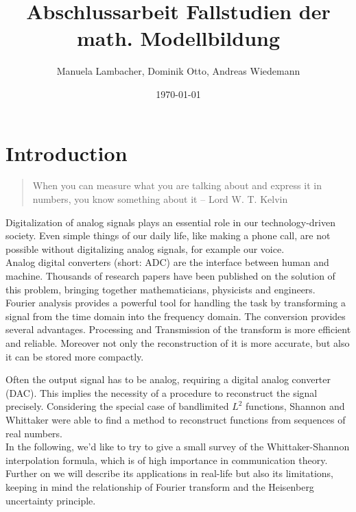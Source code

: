 \documentclass[a4paper, 11pt]{scrreprt}
\title{Abschlussarbeit Fallstudien der math. Modellbildung}
\author{Manuela Lambacher, Dominik Otto, Andreas Wiedemann}
\date{\today}
\newcommand{\student}[1]{\marginnote{{\normalfont\bf #1}}}
\begin{document}
\parindent 0pt
\maketitle
\tableofcontents

\chapter*{Introduction}

\begin{quotation}
When you can measure what you are talking about and express it in numbers, you know something about it – Lord W. T. Kelvin
\end{quotation}
\student{together}
Digitalization of analog signals plays an essential role in our technology-driven society. Even simple things of our daily life, like making a phone call, are not possible without digitalizing analog signals, for example our voice. \\
\newline
Analog digital converters (short: ADC) are the interface between human and machine. Thousands of research papers have been published on the solution of this problem, bringing together mathematicians, physicists and engineers. \\
Fourier analysis provides a powerful tool for handling the task by transforming a signal from the time domain into the frequency domain. The conversion provides several advantages. Processing and Transmission of the transform is more efficient and reliable. Moreover not only the reconstruction of it is more accurate, but also it can be stored more compactly.

Often the output signal has to be analog, requiring a digital analog converter (DAC). This implies the necessity of a procedure to reconstruct  the signal precisely. 
Considering the special case of bandlimited \(L^2\) functions, Shannon and Whittaker were able to find a method to reconstruct functions from  sequences of real numbers. \\
\newline
In the following, we'd like to try to give a small survey of the Whittaker-Shannon interpolation formula, which is of high importance in communication theory. Further on we will describe its applications in real-life but also its limitations, keeping in mind the relationship of Fourier transform and the Heisenberg uncertainty principle.
\end{document}
